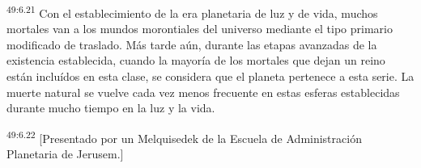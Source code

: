 \par
\textsuperscript{49:6.21} Con el establecimiento de la era planetaria de luz y de vida, muchos mortales van a los mundos morontiales del universo mediante el tipo primario modificado de traslado. Más tarde aún, durante las etapas avanzadas de la existencia establecida, cuando la mayoría de los mortales que dejan un reino están incluídos en esta clase, se considera que el planeta pertenece a esta serie. La muerte natural se vuelve cada vez menos frecuente en estas esferas establecidas durante mucho tiempo en la luz y la vida.

\par
\textsuperscript{49:6.22} [Presentado por un Melquisedek de la Escuela de Administración Planetaria de Jerusem.]